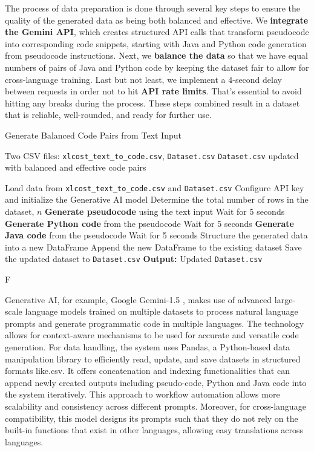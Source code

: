 \documentclass{dhbenelux}
\begin{document}
The process of data preparation is done through several key steps to ensure the quality of the generated data as being both balanced and effective. We \textbf{integrate the Gemini API}, which creates structured API calls that transform pseudocode into corresponding code snippets, starting with Java and Python code generation from pseudocode instructions. Next, we \textbf{balance the data} so that we have equal numbers of pairs of Java and Python code by keeping the dataset fair to allow for cross-language training. Last but not least, we implement a 4-second delay between requests in order not to hit \textbf{API rate limits}. That's essential to avoid hitting any breaks during the process. These steps combined result in a dataset that is reliable, well-rounded, and ready for further use.

\begin{algorithm}
\caption{Generate Balanced Code Pairs from Text Input}
\label{alg:balanced_code_pairs}
\begin{algorithmic}[1]
\Require Two CSV files: \texttt{xlcost\_text\_to\_code.csv}, \texttt{Dataset.csv}
\Ensure \texttt{Dataset.csv} updated with balanced and effective code pairs

\State Load data from \texttt{xlcost\_text\_to\_code.csv} and \texttt{Dataset.csv}
\State Configure API key and initialize the Generative AI model
\State Determine the total number of rows in the dataset, $n$
    \State \textbf{Generate pseudocode} using the text input
    \State Wait for 5 seconds
    \State \textbf{Generate Python code} from the pseudocode
    \State Wait for 5 seconds
    \State \textbf{Generate Java code} from the pseudocode
    \State Wait for 5 seconds
    \State Structure the generated data into a new DataFrame
    \State Append the new DataFrame to the existing dataset
    \State Save the updated dataset to \texttt{Dataset.csv}
\EndFor
\State \textbf{Output:} Updated \texttt{Dataset.csv}
\end{algorithmic}F
\label{alg:generate-balanced-code}
\end{algorithm}

Generative AI, for example, Google Gemini-1.5 \cite{gemini2023}, makes use of advanced large-scale language models trained on multiple datasets to process natural language prompts and generate programmatic code in multiple languages. The technology allows for context-aware mechanisms to be used for accurate and versatile code generation. For data handling, the system uses Pandas, a Python-based data manipulation library to efficiently read, update, and save datasets in structured formats like.csv. It offers concatenation and indexing functionalities that can append newly created outputs including pseudo-code, Python and Java code into the system iteratively. This approach to workflow automation allows more scalability and consistency across different prompts. Moreover, for cross-language compatibility, this model designs its prompts such that they do not rely on the built-in functions that exist in other languages, allowing easy translations across languages.
\end{document}
